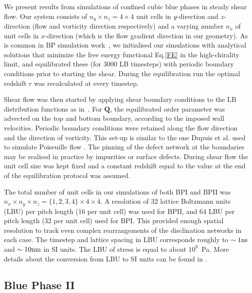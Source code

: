 \documentclass[12pt,twoside]{iopart}
\begin{document}
We present results from simulations of confined cubic blue
phases in steady shear flow.
Our system consists of $n_y\times n_z = 4\times4$ unit cells in $y$-direction
and $z$-direction (flow and vorticity direction respectively) and a varying
number $n_x$ of unit cells in $x$-direction (which is the flow gradient
direction in our geometry).
As is common in BP simulation work~\cite{Henrich:2010b,Henrich:2011a}, we initialised our simulations with analytical solutions that minimize the free energy functional Eq.\ref{FE} in the high-chirality limit, and equilibrated these (for 3000 LB timesteps) with periodic boundary conditions prior to starting the shear. During the equilibration run the optimal redshift $r$ was recalculated
at every timestep.

Shear flow was then started by applying shear boundary conditions to the LB distribution functions as in~\cite{Denniston:2004}. For ${\mathbf Q}$, the equilibrated order parameter was advected on the top and bottom boundary, according to the imposed wall velocities. Periodic boundary conditions were retained along the flow direction and the direction of vorticity.
This set-up is similar to the one Dupuis et al. used to simulate Poiseuille flow \cite{Dupuis:2005}. The pinning of the defect network at the boundaries may be realised in practice by impurities or surface defects.
During shear flow the unit cell size was kept fixed and a constant redshift equal to the value at the end of the equilibration protocol was assumed.

The total number of unit cells in our simulations of both BPI and BPII
was $n_x\times n_y \times n_z= \{1,2,3,4\} \times 4\times 4$.
A resolution of 32 lattice Boltzmann units (LBU) per pitch length
(16 per unit cell) was used for BPII, and 64 LBU per pitch length
(32 per unit cell) used for BPI.  
This provided enough spatial resolution to track even complex rearrangements
of the disclination networks in each case.
The timestep and lattice spacing in LBU corresponds roughly to
$\sim 1 {\rm ns}$ and $\sim 10{\rm nm}$ in SI units. The LBU of stress
is equal to about $10^8$~Pa. 
More details about the conversion from LBU to SI units can be found in
\cite{Henrich:2010b,Henrich:2011a}.

\subsection{Blue Phase II}\label{sec_bpii}
\end{document}
